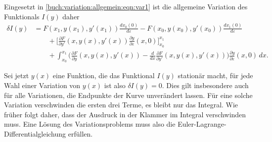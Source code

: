 Eingesetzt in 
\eqref{buch:variation:allgemein:eqn:var1}
ist die allgemeine Variation des Funktionals $I(y)$ daher
\begin{equation}
\begin{aligned}
\delta I(y)
&=
F(x_1,y(x_1),y'(x_1))
\frac{dx_0(0)}{d\varepsilon}
-
F(x_0,y(x_0),y'(x_0))
\frac{dx_1(0)}{d\varepsilon}
\\
&\qquad
+
\biggl[
\frac{\partial F}{\partial y'}(x,y(x),y'(x))
\frac{\partial y}{\partial\varepsilon}(x,0)
\biggr]_{x_0}^{x_1}
\\
&\qquad
+
\int_{x_0}^{x_1}
\biggl(
\frac{\partial F}{\partial y}(x,y(x),y'(x))
-
\frac{d}{dx}\frac{\partial F}{\partial y'}(x,y(x),y'(x))
\biggr)
\frac{\partial y}{\partial \varepsilon}(x,0)
\,dx.
\end{aligned}
\label{buch:variation:allgemein:eqn:variation}
\end{equation}

Sei jetzt $y(x)$ eine Funktion, die das Funktional $I(y)$ stationär macht,
für jede Wahl einer Variation von $y(x)$ ist also $\delta I(y)=0$.
Dies gilt insbesondere auch für alle Variationen, die Endpunkte der
Kurve unverändert lassen.
Für eine solche Variation verschwinden die ersten drei Terme, es bleibt
nur das Integral.
Wie früher folgt daher, dass der Ausdruck in der Klammer im Integral
verschwinden muss.
Eine Lösung des Variationsproblems muss also die
Euler-Lagrange-Differentialgleichung erfüllen.

